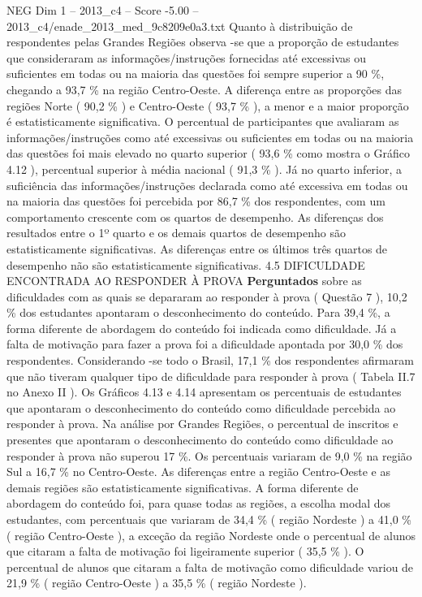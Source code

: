 \begin{textsample}{NEG Dim 1 – 2013\_c4 – Score -5.00 – 2013\_c4/enade\_2013\_med\_9c8209e0a3.txt}
Quanto à distribuição de respondentes pelas Grandes Regiões observa -se que a proporção de estudantes que consideraram as informações/instruções fornecidas até excessivas ou suficientes em todas ou na maioria das questões foi sempre superior a 90 \%, chegando a 93,7 \% na região Centro-Oeste.
A diferença entre as proporções das regiões Norte ( 90,2 \% ) e Centro-Oeste ( 93,7 \% ), a menor e a maior proporção é estatisticamente significativa.
O percentual de participantes que avaliaram as informações/instruções como até excessivas ou suficientes em todas ou na maioria das questões foi mais elevado no quarto superior ( 93,6 \% como mostra o Gráfico 4.12 ), percentual superior à média nacional ( 91,3 \% ).
Já no quarto inferior, a suficiência das informações/instruções declarada como até excessiva em todas ou na maioria das questões foi percebida por 86,7 \% dos respondentes, com um comportamento crescente com os quartos de desempenho.
As diferenças dos resultados entre o 1º quarto e os demais quartos de desempenho são estatisticamente significativas.
As diferenças entre os últimos três quartos de desempenho não são estatisticamente significativas. 4.5 DIFICULDADE ENCONTRADA AO RESPONDER À PROVA \textbf{Perguntados} sobre as dificuldades com as quais se depararam ao responder à prova ( Questão 7 ), 10,2 \% dos estudantes apontaram o desconhecimento do conteúdo.
Para 39,4 \%, a forma diferente de abordagem do conteúdo foi indicada como dificuldade.
Já a falta de motivação para fazer a prova foi a dificuldade apontada por 30,0 \% dos respondentes.
Considerando -se todo o Brasil, 17,1 \% dos respondentes afirmaram que não tiveram qualquer tipo de dificuldade para responder à prova ( Tabela II.7 no Anexo II ).
Os Gráficos 4.13 e 4.14 apresentam os percentuais de estudantes que apontaram o desconhecimento do conteúdo como dificuldade percebida ao responder à prova.
Na análise por Grandes Regiões, o percentual de inscritos e presentes que apontaram o desconhecimento do conteúdo como dificuldade ao responder à prova não superou 17 \%.
Os percentuais variaram de 9,0 \% na região Sul a 16,7 \% no Centro-Oeste.
As diferenças entre a região Centro-Oeste e as demais regiões são estatisticamente significativas.
A forma diferente de abordagem do conteúdo foi, para quase todas as regiões, a escolha modal dos estudantes, com percentuais que variaram de 34,4 \% ( região Nordeste ) a 41,0 \% ( região Centro-Oeste ), a exceção da região Nordeste onde o percentual de alunos que citaram a falta de motivação foi ligeiramente superior ( 35,5 \% ).
O percentual de alunos que citaram a falta de motivação como dificuldade variou de 21,9 \% ( região Centro-Oeste ) a 35,5 \% ( região Nordeste ).

\end{textsample}
